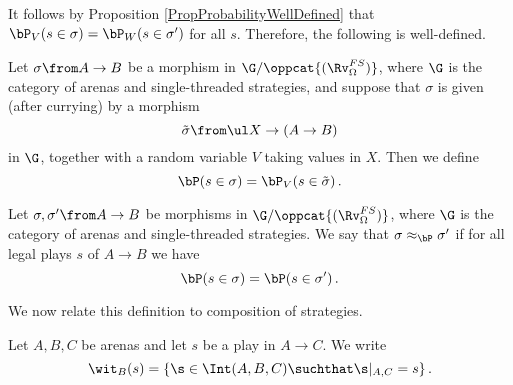 It follows by Proposition \ref{PropProbabilityWellDefined} that $\bP_V(s\in\sigma)=\bP_W(s\in\sigma')$ for all $s$.  
Therefore, the following is well-defined.

\begin{definition}
  Let $\sigma \from A \to B$ be a morphism in $\G/\oppcat{(\Rv_{\Omega}^{FS})}$, where $\G$ is the category of arenas and single-threaded strategies, and suppose that $\sigma$ is given (after currying) by a morphism
  \[
    \tilde\sigma \from \ul X \to (A \to B)
    \]
  in $\G$, together with a random variable $V$ taking values in $X$.
  Then we define
  \[
    \bP(s\in\sigma) = \bP_V(s\in\tilde\sigma)\,.
    \]
\end{definition}

\begin{definition}
  Let $\sigma,\sigma'\from A \to B$ be morphisms in $\G/\oppcat{(\Rv_{\Omega}^{FS})}$, where $\G$ is the category of arenas and single-threaded strategies.  
  We say that $\sigma\approx_{\bP}\sigma'$ if for all legal plays $s$ of $A \to B$ we have
  \[
    \bP(s\in\sigma) = \bP(s\in\sigma')\,.
    \]
  \label{DefProbabilisticEquivalenceRelation}
\end{definition}

We now relate this definition to \Mellies composition of strategies.

\begin{definition}
  Let $A,B,C$ be arenas and let $s$ be a play in $A\to C$.  
  We write
  \[
    \wit_B(s) = \{\s\in\Int(A,B,C)\suchthat \s\vert_{A,C}=s\}\,.
    \]
\end{definition}

